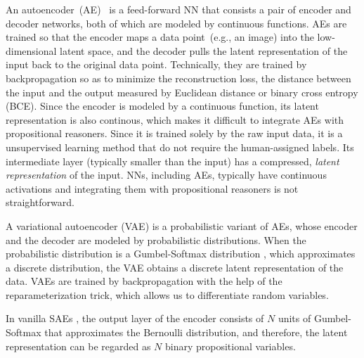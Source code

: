 An autoencoder~(AE)~\cite{hinton2006reducing} is a feed-forward NN that consists a pair of encoder and decoder networks, both of which are modeled by continuous functions.
AEs are trained so that the encoder maps a data point~(e.g., an image) into the low-dimensional latent space, and the decoder pulls the latent representation of the input back to the original data point.
Technically, they are trained by backpropagation so as to minimize the reconstruction loss, the distance between the input and the output measured by Euclidean distance or binary cross entropy (BCE).
Since the encoder is modeled by a continuous function, its latent representation is also continous, which makes it difficult to integrate AEs with propositional reasoners.
Since it is trained solely by the raw input data, it is a unsupervised learning method that do not require the human-assigned labels.
Its intermediate layer (typically smaller than the input) has a compressed, \emph{latent representation} of the input.
NNs, including AEs, typically have continuous activations and integrating them with propositional reasoners is not straightforward.
\fi

A variational autoencoder (VAE) \cite{kingma2013auto} is a probabilistic variant of AEs, whose encoder and the decoder are modeled by probabilistic distributions.
When the probabilistic distribution is a Gumbel-Softmax distribution \cite{jang2016categorical}, which approximates a discrete distribution, the VAE obtains a discrete latent representation of the data.
VAEs are trained by backpropagation with the help of the reparameterization trick, which allows us to differentiate random variables.


In vanilla SAEs \cite{Asai2018}, the output layer of the encoder consists of $N$ units of Gumbel-Softmax
that approximates the Bernoulli distribution, %
and therefore, the latent representation can be regarded as $N$ binary propositional variables.



